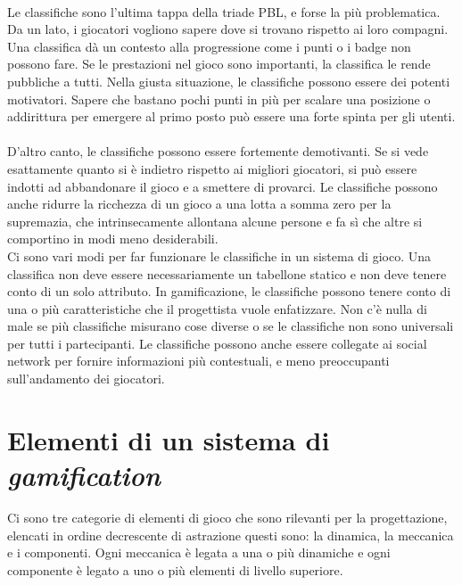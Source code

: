 \begin{itemize}
\\
Le classifiche sono l'ultima tappa della triade PBL, e forse la più problematica. Da un lato, i giocatori vogliono sapere dove si trovano rispetto ai loro compagni. Una classifica dà un contesto alla progressione come i punti o i badge non possono fare. Se le prestazioni nel gioco sono importanti, la classifica le rende pubbliche a tutti. Nella giusta situazione, le classifiche possono essere dei potenti motivatori. Sapere che bastano pochi punti in più per scalare una posizione o addirittura per emergere al primo posto può essere una forte spinta per gli utenti.\\
\\
D'altro canto, le classifiche possono essere fortemente demotivanti. Se si vede esattamente quanto si è indietro rispetto ai migliori giocatori, si può essere indotti ad abbandonare il gioco e a smettere di provarci. Le classifiche possono anche ridurre la ricchezza di un gioco a una lotta a somma zero per la supremazia, che intrinsecamente allontana alcune persone e fa sì che altre si comportino in modi meno desiderabili.\\
Ci sono vari modi per far funzionare le classifiche in un sistema di gioco. Una classifica non deve essere necessariamente un tabellone statico e non deve tenere conto di un solo attributo. In gamificazione, le classifiche possono tenere conto di una o più caratteristiche che il progettista vuole enfatizzare.
Non c'è nulla di male se più classifiche misurano cose diverse o se le classifiche non sono universali per tutti i partecipanti. Le classifiche possono anche essere collegate ai social network per fornire informazioni più contestuali, e meno preoccupanti sull'andamento dei giocatori.





\section{Elementi di un sistema di \textit{gamification}}
Ci sono tre categorie di elementi di gioco che sono rilevanti per la progettazione, elencati in ordine decrescente di astrazione questi sono: la dinamica, la meccanica e i componenti. Ogni meccanica è legata a una o più dinamiche e ogni componente è legato a uno o più elementi di livello superiore.

\end{itemize}
